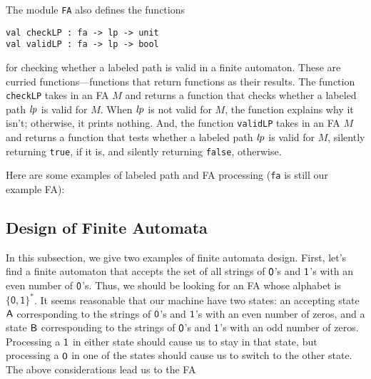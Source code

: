 The module \texttt{FA} also defines the functions
\begin{verbatim}
val checkLP : fa -> lp -> unit
val validLP : fa -> lp -> bool
\end{verbatim}
%
%
for checking whether a labeled path is valid in a finite automaton.
These are curried functions---functions that return functions
as their results.
The function \texttt{checkLP} takes in an FA $M$ and returns a function
that checks whether a labeled path ${\it lp}$ is valid for $M$.  When
${\it lp}$ is not valid for $M$, the function explains why it isn't;
otherwise, it prints nothing. 
And, the function \texttt{validLP} takes in an FA $M$ and returns a function
that tests whether a labeled path ${\it lp}$ is valid for $M$, silently
returning \texttt{true}, if it is, and silently returning \texttt{false},
otherwise.

Here are some examples of labeled path and FA processing
(\texttt{fa} is still our example FA):


\subsection{Design of Finite Automata}

%
In this subsection, we give two examples of finite automata
design.  First, let's find a finite automaton that accepts the set
of all strings of $\mathsf{0}$'s and $\mathsf{1}$'s with an even number of
$\mathsf{0}$'s.  Thus, we should be looking for an FA whose alphabet is
$\{\mathsf{0,1}\}^*$.  It seems reasonable that our machine have two
states: an accepting state $\mathsf{A}$ corresponding to the strings of
$\mathsf{0}$'s and $\mathsf{1}$'s with an even number of zeros, and a state
$\mathsf{B}$ corresponding to the strings of $\mathsf{0}$'s and $\mathsf{1}$'s with
an odd number of zeros.  Processing a $\mathsf{1}$ in either state should
cause us to stay in that state, but processing a $\mathsf{0}$ in one of
the states should cause us to switch to the other state.  The above
considerations lead us to the FA
\begin{center}

\end{center}


